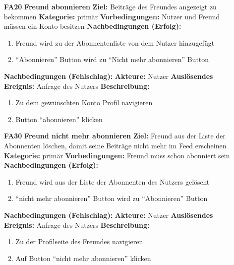\documentclass[parskip=full]{scrartcl}
\begin{document}
\begin{itemize}[nosep]
		\item[\textbf{\large FA20}]\textbf{\large Freund abonnieren}
		\newline\newline \textbf{Ziel:} Beiträge des Freundes angezeigt zu bekommen
		\newline \textbf{Kategorie:} primär
		\newline \textbf{Vorbedingungen:} Nutzer und Freund müssen ein Konto besitzen
		\newline \textbf{Nachbedingungen (Erfolg):}
		\begin{enumerate}[nosep]
			\item Freund wird zu der Abonnentenliste von dem Nutzer hinzugefügt
			\item “Abonnieren” Button wird zu “Nicht mehr abonnieren” Button
		\end{enumerate}
		\textbf{Nachbedingungen (Fehlschlag):}
		\newline \textbf{Akteure:} Nutzer
		\newline \textbf{Auslösendes Ereignis:} Anfrage des Nutzers
		\newline \textbf{Beschreibung:}
		\begin{enumerate}[nosep]
			\item Zu dem gewünschten Konto Profil navigieren
			\item Button “abonnieren” klicken
		\end{enumerate}

		\item[\textbf{\large FA30}]\textbf{\large Freund nicht mehr abonnieren}
		\newline \textbf{Ziel:} Freund aus der Liste der Abonnenten löschen, damit seine Beiträge nicht mehr im Feed erscheinen
		\newline \textbf{Kategorie:} primär
		\newline \textbf{Vorbedingungen:} Freund muss schon abonniert sein
		\newline \textbf{Nachbedingungen (Erfolg):}
		\begin{enumerate}[nosep]
			\item Freund wird aus der Liste der Abonnenten des Nutzers gelöscht
			\item “nicht mehr abonnieren” Button wird zu “Abonnieren” Button
		\end{enumerate}
		\textbf{Nachbedingungen (Fehlschlag):}
		\newline \textbf{Akteure:} Nutzer
		\newline \textbf{Auslösendes Ereignis:} Anfrage des Nutzers
		\newline \textbf{Beschreibung:}
		\begin{enumerate}[nosep]
			\item Zu der Profilseite des Freundes navigieren
			\item Auf Button “nicht mehr abonnieren” klicken
		\end{enumerate}
	\end{itemize}
\end{document}
